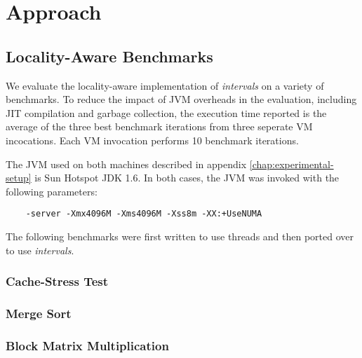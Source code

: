 
\chapter{Approach}
\label{chap:locality-approach}


\section{Locality-Aware Benchmarks}

We evaluate the locality-aware implementation of \emph{intervals} on a
variety of benchmarks. To reduce the impact of JVM overheads in the
evaluation, including JIT compilation and garbage collection, the
execution time reported is the average of the three best benchmark
iterations from three seperate VM incocations. Each VM invocation
performs 10 benchmark iterations.

The JVM used on both machines described in appendix
\ref{chap:experimental-setup} is Sun Hotspot JDK 1.6. In both cases,
the JVM was invoked with the following parameters:

\begin{verbatim}
    -server -Xmx4096M -Xms4096M -Xss8m -XX:+UseNUMA
\end{verbatim}

The following benchmarks were first written to use threads and then
ported over to use \emph{intervals}.

\subsection*{Cache-Stress Test}


\subsection*{Merge Sort}


\subsection*{Block Matrix Multiplication}



